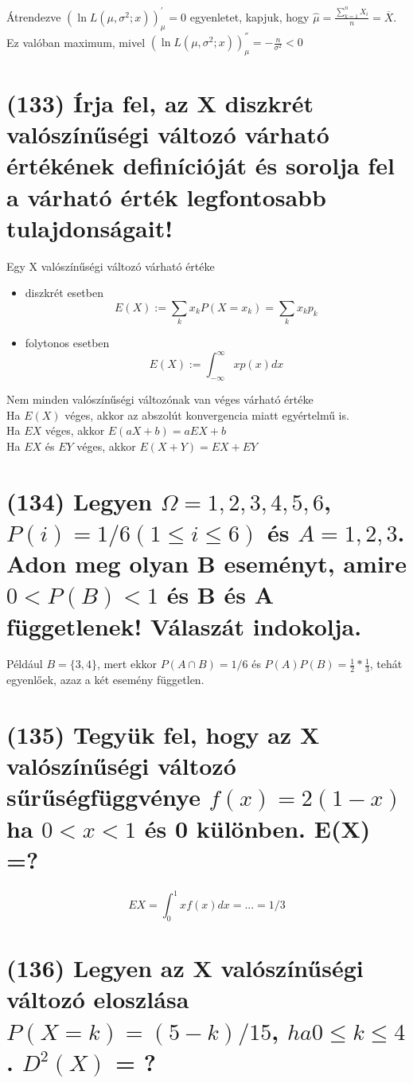 \documentclass[12p]{article}
\begin{document}
Átrendezve $(\ln L(\mu,\sigma^2;x))^{'}_{\mu} = 0$ egyenletet, kapjuk, hogy $\displaystyle{\hat{\mu} = \frac{\sum^n_{k=1} X_i}{n} = \overline{X}}$. Ez valóban maximum, mivel $(\ln L(\mu,\sigma^2;x))^{''}_{\mu} = -\frac{n}{\sigma^2} < 0$

\section{(133) Írja fel, az X diszkrét valószínűségi változó várható értékének definícióját és sorolja fel
a várható érték legfontosabb tulajdonságait!}

Egy X valószínűségi változó várható értéke

\begin{itemize}
	\item diszkrét esetben
		$$E(X) := \sum_k x_k P(X = x_k) = \sum_k x_k p_k$$
		
	\item folytonos esetben
		$$E(X) := \int_{-\infty}^\infty xp(x)dx$$
\end{itemize}

Nem minden valószínűségi változónak van véges várható értéke\\
Ha $E(X)$ véges, akkor az abszolút konvergencia miatt egyértelmű is.\\
Ha $EX$ véges, akkor $E(aX+b)=aEX+b$\\
Ha $EX$ és $EY$ véges, akkor $E(X+Y)=EX+EY$

\section{(134) Legyen $\Omega = {1, 2, 3, 4, 5, 6}$, $P(i) = 1/6 (1 \leq i \leq 6)$ és $A = {1, 2, 3}$. Adon meg olyan B
eseményt, amire $0 < P(B) < 1$ és B és A függetlenek! Válaszát indokolja.}

 Például $B = \{3, 4\}$, mert ekkor $P(A \cap B) = 1/6$ és $P(A)P(B) = \frac{1}{2} * \frac{1}{3}$, tehát egyenlőek, azaz a két esemény független.

\section{(135) Tegyük fel, hogy az X valószínűségi változó sűrűségfüggvénye $f(x) = 2(1-x)$ ha $0 < x < 1$ és 0 különben. E(X) =? }

$$EX = \int^1_0 xf(x)dx = ... = 1/3$$

\section{(136) Legyen az X valószínűségi változó eloszlása $P(X = k) = (5 - k)/15$, $ha 0 \leq k \leq 4$. $D^2(X)$ = ?}
\end{document}
